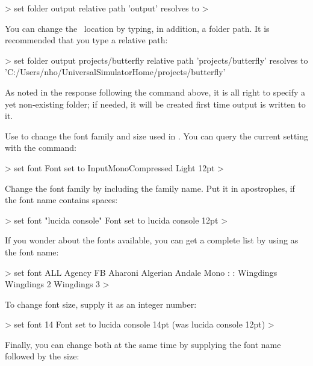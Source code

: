 \begin{usdialog}
> set folder output
relative path 'output' resolves to %
> 
\end{usdialog}

You can change the \outputfolder\ location by typing, in addition, a folder path. It is recommended that you type a relative path:

\begin{usdialog}
> set folder output projects/butterfly
relative path 'projects/butterfly' resolves to %
  'C:/Users/nho/UniversalSimulatorHome/projects/butterfly' %
\end{usdialog}

As noted in the response following the command above, it is all right to specify a yet non-existing folder; if needed, it will be created first time output is written to it.

Use  to change the font family and size used in \US. You can query the current setting with the  command:

\begin{usdialog}
> set font
Font set to InputMonoCompressed Light 12pt
>\end{usdialog}

Change the font family by including the family name. Put it in apostrophes, if the font name contains spaces:

\begin{usdialog}
> set font "lucida console"
Font set to lucida console 12pt %
> 
\end{usdialog}

If you wonder about the fonts available, you can get a complete list by using  as the font name:

\begin{usdialog}
> set font ALL
Agency FB
Aharoni
Algerian
Andale Mono
:
:
Wingdings
Wingdings 2
Wingdings 3
> 
\end{usdialog}

To change font size, supply it as an integer number:

\begin{usdialog}
> set font 14
Font set to lucida console 14pt (was lucida console 12pt)
>
\end{usdialog}

Finally, you can change both at the same time by supplying the font name followed by the size:

